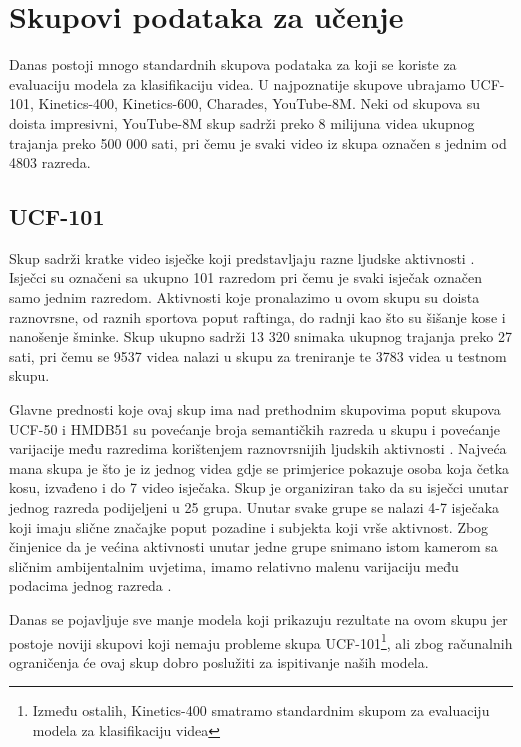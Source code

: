\documentclass[times, utf8, diplomski,  numeric]{fer}
\begin{document}
\chapter{Skupovi podataka za učenje}
Danas postoji mnogo standardnih skupova podataka za koji se koriste za evaluaciju modela za klasifikaciju videa. U najpoznatije skupove ubrajamo UCF-101, Kinetics-400, Kinetics-600, Charades, YouTube-8M. Neki od skupova su doista impresivni, YouTube-8M skup sadrži preko 8 milijuna videa ukupnog trajanja preko 500 000 sati, pri čemu je svaki video iz skupa označen s jednim od 4803 razreda.
\section{UCF-101}
Skup sadrži kratke video isječke koji predstavljaju razne ljudske aktivnosti \cite{ucf101}. Isječci su označeni sa ukupno 101 razredom pri čemu je svaki isječak označen samo jednim razredom. Aktivnosti koje pronalazimo u ovom skupu su doista raznovrsne, od raznih sportova poput raftinga, do radnji kao što su šišanje kose i nanošenje šminke. Skup ukupno sadrži 13 320 snimaka ukupnog trajanja preko 27 sati, pri čemu se 9537 videa nalazi u skupu za treniranje te 3783 videa u testnom skupu. 
\par
Glavne prednosti koje ovaj skup ima nad prethodnim skupovima poput skupova UCF-50 i HMDB51 su povećanje broja semantičkih razreda u skupu i povećanje varijacije među razredima korištenjem raznovrsnijih ljudskih aktivnosti \cite{ucf101}. Najveća mana skupa je što je iz jednog videa gdje se primjerice pokazuje osoba koja četka kosu, izvađeno i do 7 video isječaka. Skup je organiziran tako da su isječci unutar jednog razreda podijeljeni u 25 grupa. Unutar svake grupe se nalazi 4-7 isječaka koji imaju slične značajke poput pozadine i subjekta koji vrše aktivnost. Zbog činjenice da je većina aktivnosti unutar jedne grupe snimano istom kamerom sa sličnim ambijentalnim uvjetima, imamo relativno malenu varijaciju među podacima jednog razreda \cite{kinetics}.
\par
Danas se pojavljuje sve manje modela koji prikazuju rezultate na ovom skupu jer postoje noviji skupovi koji nemaju probleme skupa UCF-101\footnote{Između ostalih, Kinetics-400 smatramo standardnim skupom za evaluaciju modela za klasifikaciju videa}, ali zbog računalnih ograničenja će ovaj skup dobro poslužiti za ispitivanje naših modela.
\end{document}
